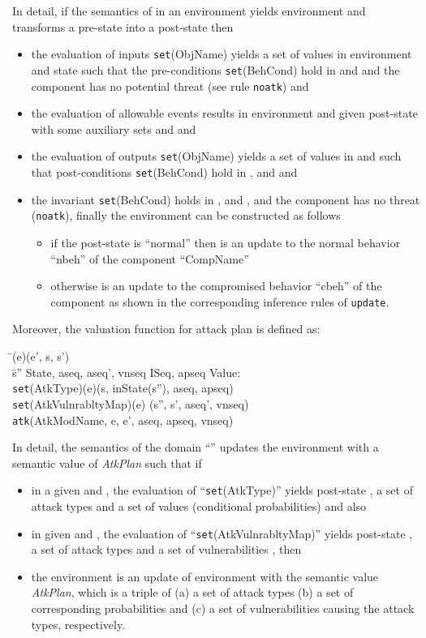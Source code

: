 \documentclass[conference]{IEEEtran}
\begin{document}
In detail, if the semantics of  in an environment  yields environment  and transforms a pre-state  into a post-state  then
\begin{itemize}
\item the evaluation of inputs \texttt{set}(ObjName) yields a set of values  in environment  and state  such that the pre-conditions \texttt{set}(BehCond) hold in  and  and the component  has no potential threat ({see rule \tt noatk}) and
\item the evaluation of allowable events results in environment  and given post-state  with some auxiliary sets  and  and
\item the evaluation of outputs \texttt{set}(ObjName) yields a set of values  in  and  such that post-conditions \texttt{set}(BehCond) hold in ,  and  and
\item the invariant  \texttt{set}(BehCond) holds in ,  and , and the component  has no threat ({\tt noatk}), finally the environment  can be constructed as follows
\begin{itemize}
\item if the post-state is ``normal'' then  is an update to the normal behavior ``nbeh'' of the component ``CompName''
\item otherwise  is an update to the compromised behavior ``cbeh'' of the component as shown in the corresponding inference rules of {\tt update}.
\end{itemize}
\end{itemize}
\enlargethispage*{1cm}
Moreover, the valuation function for attack plan is defined as:
\begin{tabbing}
\textlbrackdbl \=\textrbrackdbl (e)(e', s, s')  
\\\>  \= s''  State, aseq, aseq', vnseq  ISeq, apseq  Value: \\\>\> \textlbrackdbl \texttt{set}(AtkType)\textrbrackdbl (e)(s, inState(s''), aseq, apseq)  
\\\>\> \textlbrackdbl \texttt{set}(AtkVulnrabltyMap)\textrbrackdbl (e) (s'', s', aseq', vnseq)  
\\\>\> {\tt atk}(AtkModName, e, e', aseq, apseq, vnseq)
\end{tabbing}

In detail, the semantics of the domain ``'' updates the environment  with a semantic value of \emph{AtkPlan} such that if
\begin{itemize}
\item in a given  and , the evaluation of ``\texttt{set}(AtkType)'' yields post-state , a set of attack types  and a set of values (conditional probabilities)  and also
\item in given  and , the evaluation of ``\texttt{set}(AtkVulnrabltyMap)'' yields post-state , a set of attack types  and a set of vulnerabilities , then
\item the environment  is an update of environment  with the semantic value \emph{AtkPlan}, which is a triple of (a) a set of attack types (b) a set of corresponding probabilities and (c) a set of vulnerabilities causing the attack types, respectively.
\end{itemize}
\end{document}
